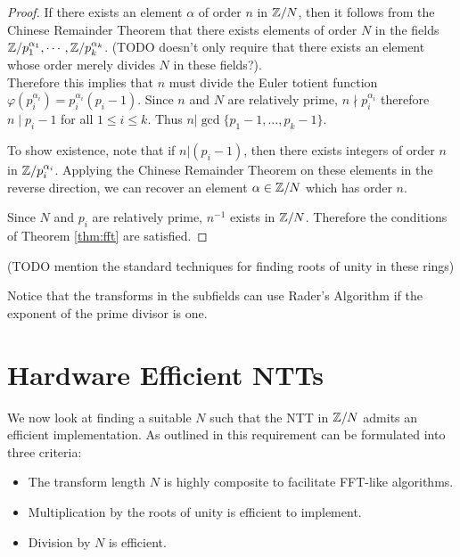 \begin{proof}
    If there exists an element $\alpha$ of order $n$ in ${\mathbb Z}/N$, then it follows from the Chinese Remainder Theorem that there exists elements of order $N$ in the fields ${\mathbb Z}/p_1^{\alpha_1}, \cdots, {\mathbb Z}/p_k^{\alpha_k}$. (TODO doesn't only require that there exists an element whose order merely divides $N$ in these fields?).\\
    Therefore this implies that $n$ must divide the Euler totient function $\varphi(p_i^{\alpha_i}) = p_i^{\alpha_i}(p_i - 1)$. Since $n$ and $N$ are relatively prime, $n \nmid p_i^{\alpha_i}$ therefore $n \mid p_i - 1$ for all $1 \le i \le k$. Thus $n | \gcd\{p_1 - 1, \ldots, p_k - 1\}$.

    \medskip

    To show existence, note that if $n | (p_i - 1)$, then there exists integers of order $n$ in ${\mathbb Z}/p_i^{\alpha_i}$. Applying the Chinese Remainder Theorem on these elements in the reverse direction, we can recover an element $\alpha \in {\mathbb Z}/N$ which has order $n$.

    \medskip

    Since $N$ and $p_i$ are relatively prime, $n^{-1}$ exists in ${\mathbb Z}/N$. Therefore the conditions of Theorem \ref{thm:fft} are satisfied.
\end{proof}

(TODO mention the standard techniques for finding roots of unity in these rings)

Notice that the transforms in the subfields can use Rader's Algorithm if the exponent of the prime divisor is one.


\section{Hardware Efficient NTTs}%
\label{sec:hardware-efficient-ntt}

We now look at finding a suitable $N$ such that the NTT in ${\mathbb Z} / N$ admits an efficient implementation. As outlined in \cite{intro-to-fmt} this requirement can be formulated into three criteria:
\begin{itemize}
    \item The transform length $N$ is highly composite to facilitate FFT-like algorithms.
    \item Multiplication by the roots of unity is efficient to implement.
    \item Division by $N$ is efficient.
\end{itemize}

